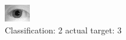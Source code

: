\begin{figure}[h!]
\begin{center}
\includegraphics[width=0.60\columnwidth]{figures/ID1051_class_2_target_3.png}
\end{center}
\caption{ Classification: 2 actual target: 3}
\label{fig:ID1051_class_2_target_3}
\end{figure}

